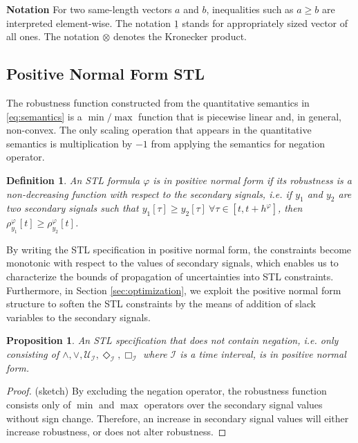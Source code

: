 \documentclass[letterpaper, 10 pt, conference]{ieeeconf}
\newtheorem{define}{Definition}
\newtheorem{proposition}{Proposition}
\begin{document}
{\bf Notation} For two same-length vectors $a$ and $b$, inequalities such as $a\ge b$ are interpreted element-wise. The notation $\underline{1}$ stands for appropriately sized vector of all ones. The notation $\otimes$ denotes the Kronecker product.

\subsection{Positive Normal Form STL}


The robustness function constructed from the quantitative semantics in \eqref{eq:semantics} is a $\min/\max$ function that is piecewise linear and, in general, non-convex. The only scaling operation that appears in the quantitative semantics is multiplication by $-1$ from applying the semantics for negation operator. 





\begin{define}
An STL formula $\varphi$ is in \emph{positive normal form} if its robustness is a non-decreasing function with respect to the secondary signals, i.e. if $y_1$ and $y_2$ are two secondary signals such that $y_1[\tau] \geq y_2[\tau] ~\forall \tau \in [t,t+h^\varphi]$, then $\rho_{y_1}^\varphi[t] \geq  \rho_{y_2}^\varphi[t]$. 
\end{define}
By writing the STL specification in positive normal form, the constraints become monotonic with respect to the values of secondary signals, which enables us to characterize the bounds of propagation of uncertainties into STL constraints. Furthermore, in Section \ref{sec:optimization}, we exploit the positive normal form structure to soften the STL constraints by the means of addition of slack variables to the secondary signals.   

\begin{proposition}
An STL specification that does not contain negation, i.e. only consisting of $\wedge,\vee, \mathcal{U}_\mathcal{I},  \Diamond_\mathcal{I}, \Box_\mathcal{I}$ where $\mathcal{I}$ is a time interval, is in positive normal form. 
\end{proposition}
\begin{proof}(sketch)
By excluding the negation operator, the robustness function consists only of $\min$ and $\max$ operators over the secondary signal values without sign change. Therefore, an increase in secondary signal values will either increase robustness, or does not alter robustness. 
\end{proof}
\end{document}
